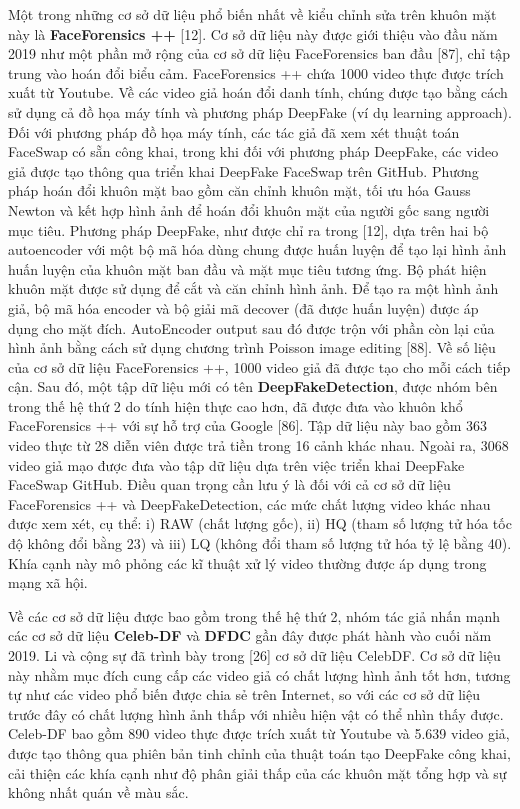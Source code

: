 \documentclass{article}
\begin{document}
Một trong những cơ sở dữ liệu phổ biến nhất về kiểu chỉnh sửa trên khuôn mặt này là \textbf{FaceForensics ++} [12]. Cơ sở dữ liệu này được giới thiệu vào đầu năm 2019 như một phần mở rộng của cơ sở dữ liệu FaceForensics ban đầu [87], chỉ tập trung vào hoán đổi biểu cảm. FaceForensics ++ chứa 1000 video thực được trích xuất từ Youtube. Về các video giả hoán đổi danh tính, chúng được tạo bằng cách sử dụng cả đồ họa máy tính và phương pháp DeepFake (ví dụ learning approach). Đối với phương pháp đồ họa máy tính, các tác giả đã xem xét thuật toán FaceSwap có sẵn công khai, trong khi đối với phương pháp DeepFake, các video giả được tạo thông qua triển khai DeepFake FaceSwap trên GitHub. Phương pháp hoán đổi khuôn mặt bao gồm căn chỉnh khuôn mặt, tối ưu hóa Gauss Newton và kết hợp hình ảnh để hoán đổi khuôn mặt của người gốc sang người mục tiêu. Phương pháp DeepFake, như được chỉ ra trong [12], dựa trên hai bộ autoencoder với một bộ mã hóa dùng chung được huấn luyện để tạo lại hình ảnh huấn luyện của khuôn mặt ban đầu và mặt mục tiêu tương ứng. Bộ phát hiện khuôn mặt được sử dụng để cắt và căn chỉnh hình ảnh. Để tạo ra một hình ảnh giả, bộ mã hóa encoder và bộ giải mã decover (đã được huấn luyện) được áp dụng cho mặt đích. AutoEncoder output sau đó được trộn với phần còn lại của hình ảnh bằng cách sử dụng chương trình Poisson image editing [88]. Về số liệu của cơ sở dữ liệu FaceForensics ++, 1000 video giả đã được tạo cho mỗi cách tiếp cận. Sau đó, một tập dữ liệu mới có tên \textbf{DeepFakeDetection}, được nhóm bên trong thế hệ thứ 2 do tính hiện thực cao hơn, đã được đưa vào khuôn khổ FaceForensics ++ với sự hỗ trợ của Google [86]. Tập dữ liệu này bao gồm 363 video thực từ 28 diễn viên được trả tiền trong 16 cảnh khác nhau. Ngoài ra, 3068 video giả mạo được đưa vào tập dữ liệu dựa trên việc triển khai DeepFake FaceSwap GitHub. Điều quan trọng cần lưu ý là đối với cả cơ sở dữ liệu FaceForensics ++ và DeepFakeDetection, các mức chất lượng video khác nhau được xem xét, cụ thể: i) RAW (chất lượng gốc), ii) HQ (tham số lượng tử hóa tốc độ không đổi bằng 23) và iii) LQ (không đổi tham số lượng tử hóa tỷ lệ bằng 40). Khía cạnh này mô phỏng các kĩ thuật xử lý video thường được áp dụng trong mạng xã hội.

Về các cơ sở dữ liệu được bao gồm trong thế hệ thứ 2, nhóm tác giả nhấn mạnh các cơ sở dữ liệu \textbf{Celeb-DF} và \textbf{DFDC }gần đây được phát hành vào cuối năm 2019. Li và cộng sự đã trình bày trong [26] cơ sở dữ liệu CelebDF. Cơ sở dữ liệu này nhằm mục đích cung cấp các video giả có chất lượng hình ảnh tốt hơn, tương tự như các video phổ biến được chia sẻ trên Internet, so với các cơ sở dữ liệu trước đây có chất lượng hình ảnh thấp với nhiều hiện vật có thể nhìn thấy được. Celeb-DF bao gồm 890 video thực được trích xuất từ Youtube và 5.639 video giả, được tạo thông qua phiên bản tinh chỉnh của thuật toán tạo DeepFake công khai, cải thiện các khía cạnh như độ phân giải thấp của các khuôn mặt tổng hợp và sự không nhất quán về màu sắc.
\end{document}
